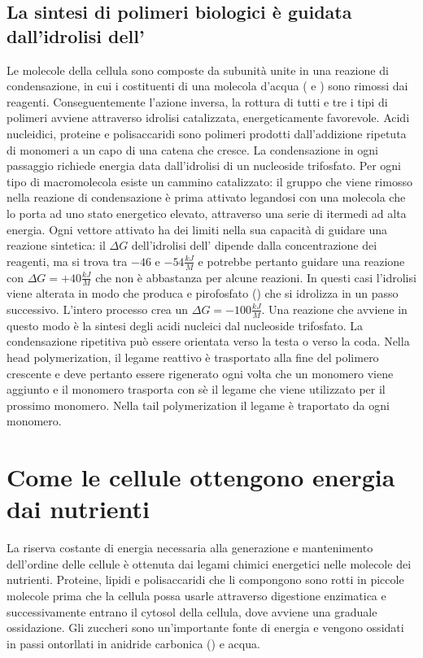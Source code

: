\subsection{La sintesi di polimeri biologici \`e guidata dall'idrolisi dell'}
Le molecole della cellula sono composte da subunit\`a unite in una reazione di condensazione, in cui i costituenti di una molecola d'acqua ( e ) sono rimossi dai reagenti.
Conseguentemente l'azione inversa, la rottura di tutti e tre i tipi di polimeri avviene attraverso idrolisi catalizzata, energeticamente favorevole. Acidi nucleidici, proteine e 
polisaccaridi sono polimeri prodotti dall'addizione ripetuta di monomeri a un capo di una catena che cresce. La condensazione in ogni passaggio richiede energia data dall'idrolisi di un
nucleoside trifosfato. Per ogni tipo di macromolecola esiste un cammino catalizzato: il gruppo  che viene rimosso nella reazione di condensazione \`e prima attivato legandosi
con una molecola che lo porta ad uno stato energetico elevato, attraverso una serie di itermedi ad alta energia. Ogni vettore attivato ha dei limiti nella sua capacit\`a di guidare una
reazione sintetica: il $\Delta G$ dell'idrolisi dell' dipende dalla concentrazione dei reagenti, ma si trova tra $-46$ e $-54\frac{kJ}{M}$ e potrebbe pertanto guidare una 
reazione con $\Delta G = +40\frac{kJ}{M}$ che non \`e abbastanza per alcune reazioni. In questi casi l'idrolisi viene alterata in modo che produca  e pirofosfato () che
si idrolizza in un passo successivo. L'intero processo crea un $\Delta G = -100\frac{kJ}{M}$. Una reazione che avviene in questo modo \`e la sintesi degli acidi nucleici dal nucleoside
trifosfato. La condensazione ripetitiva pu\`o essere orientata verso la testa o verso la coda. Nella head polymerization, il legame reattivo \`e trasportato alla fine del polimero 
crescente e deve pertanto essere rigenerato ogni volta che un monomero viene aggiunto e il monomero trasporta con s\`e il legame che viene utilizzato per il prossimo monomero. Nella 
tail polymerization il legame \`e traportato da ogni monomero. 
\section{Come le cellule ottengono energia dai nutrienti}
La riserva costante di energia necessaria alla generazione e mantenimento dell'ordine delle cellule \`e ottenuta dai legami chimici energetici nelle molecole dei nutrienti. Proteine, 
lipidi e polisaccaridi che li compongono sono rotti in piccole molecole prima che la cellula possa usarle attraverso digestione enzimatica e successivamente entrano il cytosol della 
cellula, dove avviene una graduale ossidazione. Gli zuccheri sono un'importante fonte di energia e vengono ossidati in passi ontorllati in anidride carbonica () e acqua. 
